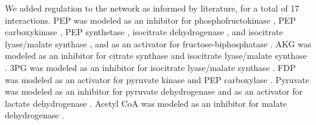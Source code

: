 \documentclass[12pt]{article}
\begin{document}
We added regulation to the network as informed by literature, for a total of 17 interactions.
PEP was modeled as an inhibitor for phosphofructokinase \cite{2010_kotte_MolSystBiol,2011_cabrera_JBiolChem}, PEP carboxykinase \cite{2010_kotte_MolSystBiol}, PEP synthetase \cite{2010_kotte_MolSystBiol,1973_chulavatnatol_JBiolChem}, isocitrate dehydrogenase \cite{2010_kotte_MolSystBiol,2007_ogawa_JBacteriol}, and isocitrate lyase/malate synthase \cite{2010_kotte_MolSystBiol,2007_ogawa_JBacteriol,1988_mackintosh_BiochemJ}, and as an activator for fructose-biphosphatase \cite{2010_kotte_MolSystBiol,2000_donahue_JBacteriol,2006_hines_JBiolChem,2007_hines_JBiolChem}.
AKG was modeled as an inhibitor for citrate synthase \cite{2010_kotte_MolSystBiol,1994_pereira_JBiolChem,1983_robinson_FEBSLett} and isocitrate lyase/malate synthase \cite{2010_kotte_MolSystBiol,1988_mackintosh_BiochemJ}.
3PG was modeled as an inhibitor for isocitrate lyase/malate synthase \cite{2010_kotte_MolSystBiol,1988_mackintosh_BiochemJ}.
FDP was modeled as an activator for pyruvate kinase \cite{2010_kotte_MolSystBiol,2010_zhu_Biochimie} and PEP carboxylase \cite{2010_kotte_MolSystBiol,1972_wohl_JBiolChem}.
Pyruvate was modeled as an inhibitor for pyruvate dehydrogenase \cite{2010_kotte_MolSystBiol,2007_kale_JBiolChem,2002_arjunan_Biochemistry} and as an activator for lactate dehydrogenase \cite{2008_okino_ApplMicrobiolBiotechnol}.
Acetyl CoA was modeled as an inhibitor for malate dehydrogenase \cite{2010_kotte_MolSystBiol}.
\end{document}
